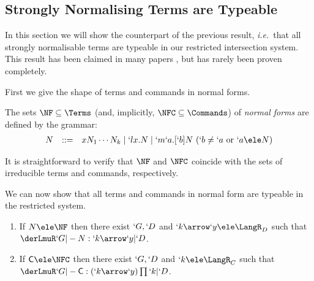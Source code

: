 \documentclass{CSML}
\def\ie{\emph{i.e.}}
\begin{document}
 \subsection{Strongly Normalising Terms are Typeable} \label{sub:NormType}

In this section we will show the counterpart of the previous result, \ie~that all strongly normalisable terms are typeable in our restricted intersection system.
This result has been claimed in many papers \cite{Pottinger'80,Bakel-TCS'92}, but has rarely been proven completely.

First we give the shape of terms and commands in normal forms.

 \begin{defi} 
The sets $\NF \subseteq \Terms$ (and, implicitly, $\NFC\subseteq \Commands$) of \emph{normal forms} are defined by the grammar:
%
 \[ \begin{array}{rcl}
N & :: =& x N_1 \cdots N_k \mid `lx.N \mid `m`a.[`b]N ~ (`b \not= `a \textrm{ or } `a \ele N %
) 
 \end{array} \]
 \end{defi}

\noindent
It is straightforward to verify that $\NF$ and $\NFC$ coincide with the sets of irreducible terms and commands, respectively.

We can now show that all terms and commands in normal form are typeable in the restricted system.

 \begin{lem} \label{prop:NFaretypeable}\hfill
 \begin{enumerate}
 \item \label{prop:NFaretypeable-terms}
If $N \ele \NF$ then there exist $`G,`D $ and $`k\arrow `y \ele \LangR_D$ such that $ \derLmuR `G |- N : `k\arrow `y | `D $.

 \item \label{prop:NFaretypeable-commands}
If ${\Cmd} \ele \NFC$ then there exist $`G,`D $ and $`k \ele \LangR_C$ such that $ \derLmuR `G |- {\Cmd} : (`k\arrow `y)\prod `k | `D $.

 \end{enumerate}
 \end{lem}
\end{document}

